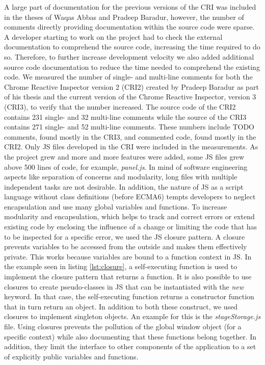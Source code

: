 A large part of documentation for the previous versions of the CRI was included in the theses of Waqas Abbas and Pradeep Baradur, however, the number of comments directly providing documentation within the source code were sparse. A developer starting to work on the project had to check the external documentation to comprehend the source code, increasing the time required to do so. Therefore, to further increase development velocity we also added additional source code documentation to reduce the time needed to comprehend the existing code. We measured the number of single- and multi-line comments for both the Chrome Reactive Inspector version 2 (CRI2) created by Pradeep Baradur as part of his thesis and the current version of the Chrome Reactive Inspector, version 3 (CRI3), to verify that the number increased. The source code of the CRI2 contains 231 single- and 32 multi-line comments while the source of the CRI3 contains 271 single- and 52 multi-line comments. These numbers include TODO comments, found mostly in the CRI3, and commented code, found mostly in the CRI2. Only JS files developed in the CRI were included in the measurements. 
As the project grew and more and more features were added, some JS files grew above 500 lines of code, for example, \emph{panel.js}. In mind of software engineering aspects like separation of concerns and modularity, long files with multiple independent tasks are not desirable. In addition, the nature of JS as a script language without class definitions (before ECMA6) tempts developers to neglect encapsulation and use many global variables and functions. To increase modularity and encapsulation, which helps to track and correct errors or extend existing code by enclosing the influence of a change or limiting the code that has to be inspected for a specific error, we used the JS closure pattern. A closure prevents variables to be accessed from the outside and makes them effectively private. This works because variables are bound to a function context in JS. In the example seen in listing \ref{lst:closure}, a self-executing function is used to implement the closure pattern that returns a function. It is also possible to use closures to create pseudo-classes in JS that can be instantiated with the \emph{new} keyword. In that case, the self-executing function returns a constructor function that in turn return an object. In addition to both these construct, we used closures to implement singleton objects. An example for this is the \emph{stageStorage.js} file. Using closures prevents the pollution of the global window object (for a specific context) while also documenting that these functions belong together. In addition, they limit the interface to other components of the application to a set of explicitly public variables and functions.
